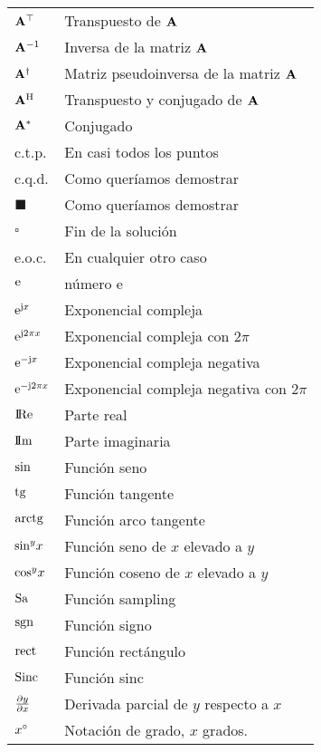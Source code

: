 \begin{longtable}{p{3cm}p{8.5cm}}
$\mathbf{A}^\top$ & Transpuesto de $\mathbf{A}$\\
$\mathbf{A}^{-1}$ & Inversa de la matriz $\mathbf{A}$\\
$\mathbf{A}{^\dagger}$ & Matriz pseudoinversa de la matriz $\mathbf{A}$\\
$\mathbf{A}^\mathrm{H}$ & Transpuesto  y conjugado de $\mathbf{A}$\\
$\mathbf{A}^*$ & Conjugado\\
c.t.p. & En casi todos los puntos\\
c.q.d. & Como queríamos demostrar\\
\ensuremath{\blacksquare}& Como queríamos demostrar\\
\ensuremath{\square}& Fin de la solución\\
e.o.c. & En cualquier otro caso\\
$\mathrm{e}$ & número e\\
$\mathrm{e}^{\textrm{j}{x}}$ & Exponencial compleja\\
$\mathrm{e}^{\textrm{j}2\pi{x}}$ & Exponencial compleja con $2\pi$\\
$\mathrm{e}^{-\textrm{j}{x}}$ & Exponencial compleja negativa\\
$\mathrm{e}^{-\textrm{j}2\pi{x}}$ & Exponencial compleja negativa con $2\pi$\\
$\mbox{$\mathrm{I\!Re}$}$ & Parte real\\
$\mbox{$\mathrm{I\!Im}$}$ & Parte imaginaria\\
$\operatorname{sin}$ & Función seno \\
$\operatorname{tg}$ & Función tangente \\
$\operatorname{arctg}$ & Función arco tangente \\
$\sin^{y}\!x$ & Función seno de $x$  elevado a $y$\\
$\cos^{y}\!x$ & Función coseno de $x$  elevado a $y$\\
$\operatorname{Sa}$ & Función sampling \\
$\operatorname{sgn}$ & Función signo \\
$\operatorname{rect}$ & Función rectángulo \\
$\operatorname{Sinc}$ & Función sinc\\
$\frac{\partial y}{\partial x} $ & Derivada parcial de $y$ respecto a $x$\\
$x^\circ$ & Notación de grado, $x$ grados.\\
%

\end{longtable}
